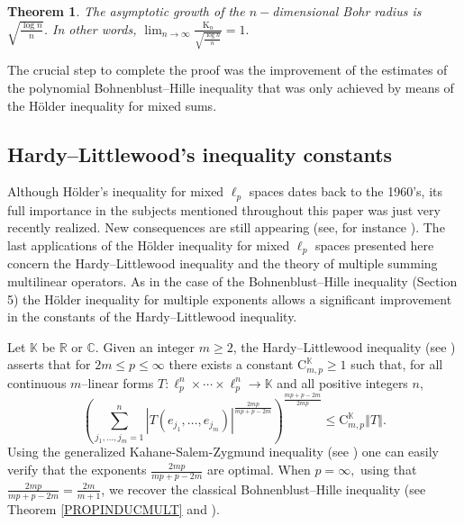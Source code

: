 \documentclass[10pt]{amsart}
\newtheorem{theorem}{Theorem}[section]
\numberwithin{equation}{section}
\begin{document}
\begin{theorem}
The asymptotic growth of the $n-$dimensional Bohr radius is $\sqrt{\frac{\log n}{n}}$. In other words, $\displaystyle \lim_{n\rightarrow \infty }\frac{\mathrm{K}_{n}}{\sqrt{\frac{\log n}{n}}}=1.$
\end{theorem}

The crucial step to complete the proof was the improvement of the estimates
of the polynomial Bohnenblust--Hille inequality that was only achieved by
means of the H\"{o}lder inequality for mixed sums.

\subsection{Hardy--Littlewood's inequality constants}

Although H\"{o}lder's inequality for mixed $\ell _{p}$ spaces dates back to
the 1960's, its full importance in the subjects mentioned throughout this
paper was just very recently realized. New consequences are still appearing
(see, for instance \cite{joedson,aps,carando}). The last applications of the
H\"{o}lder inequality for mixed $\ell _{p}$ spaces presented here concern
the Hardy--Littlewood inequality and the theory of multiple summing
multilinear operators. As in the case of the Bohnenblust--Hille inequality
(Section 5) the H\"{o}lder inequality for multiple exponents allows a
significant improvement in the constants of the Hardy--Littlewood inequality.

Let $\mathbb{K}$ be $\mathbb{R}$ or $\mathbb{C}$. Given an integer $m\geq 2$, the Hardy--Littlewood inequality (see \cite{alb, hardy,pra}) asserts that
for $2m\leq p\leq \infty $ there exists a constant $\mathrm{C}_{m,p}^{\mathbb{K}}\geq 1$ such that, for all continuous $m$--linear forms $T:\ell
_{p}^{n}\times \cdots \times \ell _{p}^{n}\rightarrow \mathbb{K}$ and all
positive integers $n$,
\begin{equation}
\left( \sum_{j_{1},\ldots ,j_{m}=1}^{n}\left\vert T(e_{j_{1}},\ldots
,e_{j_{m}})\right\vert ^{\frac{2mp}{mp+p-2m}}\right) ^{\frac{mp+p-2m}{2mp}}\leq \mathrm{C}_{m,p}^{\mathbb{K}}\left\Vert T\right\Vert .  \label{i99}
\end{equation}Using the generalized Kahane-Salem-Zygmund inequality (see \cite{alb}) one
can easily verify that the exponents $\frac{2mp}{mp+p-2m}$ are optimal. When
$p=\infty,$ using that $\frac{2mp}{mp+p-2m}=\frac{2m}{m+1}$, we recover the
classical Bohnenblust--Hille inequality (see Theorem \ref{PROPINDUCMULT} and
\cite{bh}).
\end{document}
